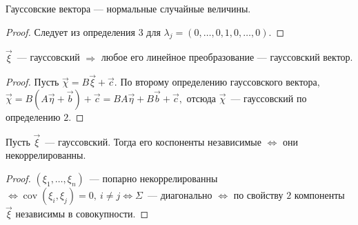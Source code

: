	\begin{property}[Коши]
		Гауссовские вектора --- нормальные случайные величины.
		\begin{proof}
			Следует из определения \(3\) для \(\lambda_j = (0, \ldots, 0, 1, 0, \ldots, 0).\)
		\end{proof}
	\end{property}

	\begin{property}
		\(\vec{\xi}\)~--- гауссовский \(\Rightarrow\) любое его линейное преобразование --- гауссовский вектор.
		\begin{proof}
			Пусть \(\vec{\chi} = B\vec{\xi} + \vec{c}.\) По второму определению гауссовского вектора, \(\vec{\chi} = B(A\vec{\eta} + \vec{b}) + \vec{c} = BA\vec{\eta} + B\vec{b} + \vec{c},\) отсюда \(\vec{\chi}\)~--- гауссовский по определению \(2.\)
		\end{proof}
	\end{property}
	\begin{property}
		Пусть \(\vec{\xi}\)~--- гауссовский. Тогда его коспоненты независимые \(\Leftrightarrow\) они некоррелированны.
		\begin{proof}
			\((\xi_1, \ldots, \xi_n)\)~--- попарно некоррелированны \(\Leftrightarrow \operatorname{cov}(\xi_i, \xi_j) = 0, ~i \neq j \Leftrightarrow \Sigma\)~--- диагонально \(\Leftrightarrow\) по свойству \(2\) компоненты \(\vec{\xi}\) независимы в совокупности.
		\end{proof}
	\end{property}